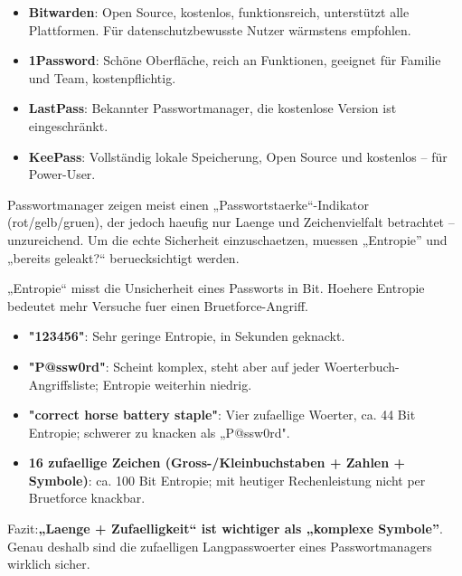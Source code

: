 
\begin{itemize}
  \item \textbf{Bitwarden}: Open Source, kostenlos, funktionsreich, unterstützt alle Plattformen. Für datenschutzbewusste Nutzer wärmstens empfohlen.
  \item \textbf{1Password}: Schöne Oberfläche, reich an Funktionen, geeignet für Familie und Team, kostenpflichtig.
  \item \textbf{LastPass}: Bekannter Passwortmanager, die kostenlose Version ist eingeschränkt.
  \item \textbf{KeePass}: Vollständig lokale Speicherung, Open Source und kostenlos – für Power-User.
\end{itemize}


Passwortmanager zeigen meist einen „Passwortstaerke“-Indikator (rot/gelb/gruen), der jedoch haeufig nur Laenge und Zeichenvielfalt betrachtet – unzureichend. Um die echte Sicherheit einzuschaetzen, muessen „Entropie” und „bereits geleakt?“ beruecksichtigt werden.


„Entropie“ misst die Unsicherheit eines Passworts in Bit. Hoehere Entropie bedeutet mehr Versuche fuer einen Bruetforce-Angriff.

\begin{itemize}
  \item \textbf{"123456"}: Sehr geringe Entropie, in Sekunden geknackt.
  \item \textbf{"P@ssw0rd"}: Scheint komplex, steht aber auf jeder Woerterbuch-Angriffsliste; Entropie weiterhin niedrig.
  \item \textbf{"correct horse battery staple"}: Vier zufaellige Woerter, ca. 44 Bit Entropie; schwerer zu knacken als „P@ssw0rd".
  \item \textbf{16 zufaellige Zeichen (Gross-/Kleinbuchstaben + Zahlen + Symbole)}: ca. 100 Bit Entropie; mit heutiger Rechenleistung nicht per Bruetforce knackbar.
\end{itemize}

Fazit:\textbf{„Laenge + Zufaelligkeit“ ist wichtiger als „komplexe Symbole”}. Genau deshalb sind die zufaelligen Langpasswoerter eines Passwortmanagers wirklich sicher.


